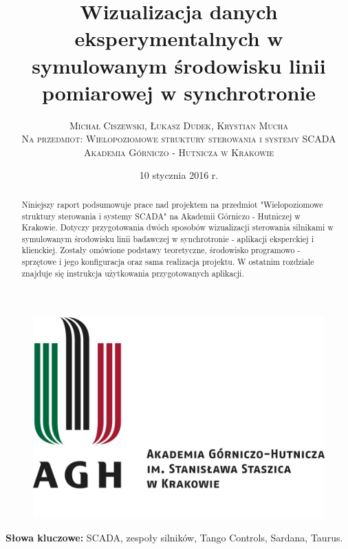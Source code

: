 \documentclass[twoside]{article}
\title{\vspace{-15mm}\fontsize{24pt}{10pt}\selectfont\textbf{Wizualizacja danych eksperymentalnych w symulowanym środowisku linii pomiarowej w synchrotronie}} %
\author{
\large
\textsc{Michał Ciszewski, Łukasz Dudek, Krystian Mucha}\\[3mm] %
\textsc{Na przedmiot: Wielopoziomowe struktury sterowania i systemy SCADA}\\[3mm] %
\textsc{Akademia Górniczo - Hutnicza w Krakowie}\\[1mm] %
}
\date{10 stycznia 2016 r.}
\begin{document}
	
\begin{figure}
	\centering
	\includegraphics[width=0.9\linewidth]{Grafika/agh_logo}
	\label{fig:agh-logo}
\end{figure}

\maketitle %

\thispagestyle{fancy} %

\clearpage


\vspace{10mm}
\begin{abstract}

\noindent Niniejszy raport podsumowuje prace nad projektem na przedmiot "Wielopoziomowe struktury sterowania i systemy SCADA" na Akademii Górniczo - Hutniczej w Krakowie. Dotyczy przygotowania dwóch sposobów wizualizacji sterowania silnikami w symulowanym środowisku linii badawczej w synchrotronie - aplikacji eksperckiej i klienckiej. Zostały omówione podstawy teoretyczne, środowisko programowo - sprzętowe i jego konfiguracja oraz sama realizacja projektu. W ostatnim rozdziale znajduje się instrukcja użytkowania przygotowanych aplikacji.

\end{abstract}

\smallskip
\noindent \textbf{Słowa kluczowe:} SCADA, zespoły silników, Tango Controls, Sardana, Taurus.

\tableofcontents
\end{document}
